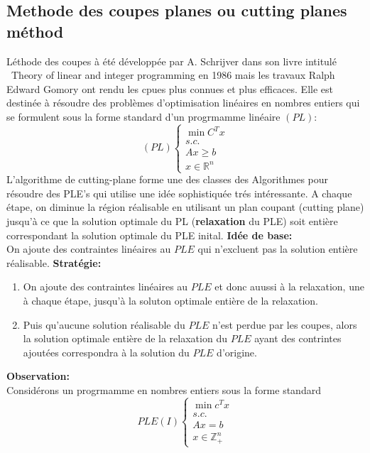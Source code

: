 \documentclass[a4paper,11pt,oneside]{report}
\theoremstyle{plain}
\newcommand{\0}{/ \! \! \! 0}
\theoremstyle{plain}
\begin{document}
\subsection{Methode des coupes planes ou cutting planes m\'ethod}
L\'ethode des coupes \`a \'et\'e d\'evelopp\'ee par A. Schrijver dans son livre intitul\'e {\ Theory of linear and integer programming} en 1986 mais 
les travaux Ralph Edward Gomory ont rendu les cpues plus connues et plus efficaces. Elle est destin\'ee \`a r\'esoudre des probl\`emes d'optimisation
lin\'eaires en nombres entiers qui se formulent sous la forme standard d'un progrmamme lin\'eaire $(PL)$:\\
\begin{equation}
    (PL)  \left\{\begin{array}{l}
               \min C^T x  \\
               s.c.         \\
               Ax \geq b     \\
               x\in \mathbb{R}^n
              \end{array}
      \right.
\end{equation}
L'algorithme de cutting-plane forme une des classes des Algorithmes pour r\'esoudre des PLE's qui utilise une id\'ee sophistiqu\'ee tr\'es
int\'eressante. A chaque \'etape, on diminue la r\'egion r\'ealisable en utilisant un plan coupant (cutting plane) jusqu'\`a ce que la solution 
optimale du PL ({\bfseries relaxation} du PLE) soit enti\`ere correspondant la solution optimale du PLE inital.
{\bf Id\'ee de base: }\\
On ajoute des contraintes lin\'eaires au $PLE$ qui n'excluent pas la solution enti\`ere r\'ealisable.
{\bf Strat\'egie:}
\begin{enumerate}
 \item On ajoute des contraintes lin\'eaires au $PLE$ et donc auussi \`a la relaxation, une \`a chaque \'etape, jusqu'\`a la soluton optimale 
  enti\`ere de la relaxation.
 \item Puis qu'aucune solution r\'ealisable du $PLE$ n'est perdue par les coupes, alors la solution optimale enti\`ere de la relaxation du $PLE$ ayant
 des contrintes ajout\'ees correspondra \`a la solution du $PLE$ d'origine.
\end{enumerate}
 {\bf Observation:}\\
 Consid\'erons un progrmamme en nombres entiers sous la forme standard
 \begin{equation}
  PLE(I) \left\{\begin{array}{l}
                \min  c^Tx  \\
                s.c.         \\
                Ax = b        \\
                x \in \mathbb{Z}_+^n
               \end{array} 
         \right.
 \end{equation}
\end{document}
